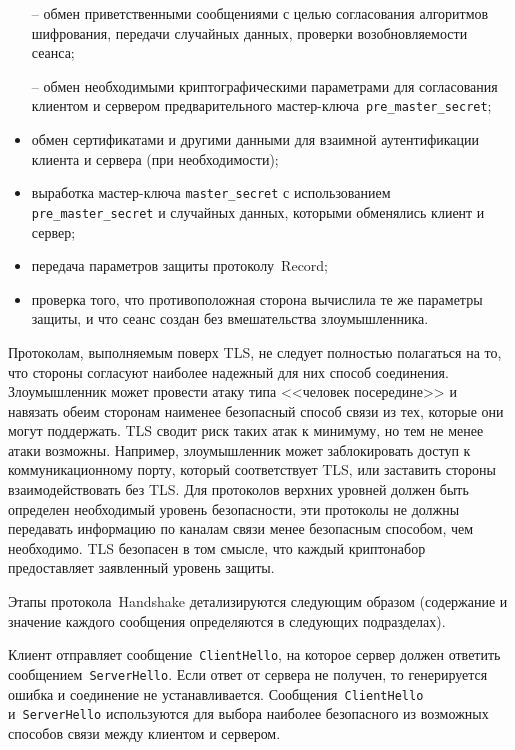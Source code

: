 \begin{itemize}
\item[--] 
обмен приветственными сообщениями с целью согласования алгоритмов 
шифрования, передачи случайных данных, проверки возобновляемости сеанса; 

\item[--] 
обмен необходимыми криптографическими параметрами для 
согласования клиентом и сервером предварительного 
мастер-ключа~\lstinline{pre_master_secret};  

\item[--]
обмен сертификатами и другими данными для взаимной аутентификации клиента 
и сервера (при необходимости); 

\item[--]
выработка мастер-ключа \lstinline{master_secret} с использованием 
\lstinline{pre_master_secret} и случайных данных, которыми обменялись  
клиент и сервер; 

\item[--]
передача параметров защиты протоколу~Record;

\item[--]
проверка того, что противоположная сторона вычислила те же параметры 
защиты, и что сеанс создан без вмешательства злоумышленника. 
\end{itemize}

Протоколам, выполняемым поверх TLS, не следует полностью полагаться на то, 
что стороны согласуют наиболее надежный для них способ соединения. 
Злоумышленник может провести атаку типа <<человек посередине>> и навязать 
обеим сторонам наименее безопасный способ связи из тех, которые они могут 
поддержать. TLS сводит риск таких атак к минимуму, но тем не менее атаки 
возможны. Например, злоумышленник может заблокировать доступ к 
коммуникационному порту, который соответствует TLS, или заставить стороны 
взаимодействовать без TLS. Для протоколов верхних уровней должен быть 
определен необходимый уровень безопасности, эти протоколы не должны 
передавать информацию по каналам связи менее безопасным способом, чем 
необходимо. TLS безопасен в том смысле, что каждый криптонабор 
предоставляет заявленный уровень защиты. 

Этапы протокола~Handshake детализируются следующим образом 
(содержание и значение каждого сообщения определяются в следующих 
подразделах). 

Клиент отправляет сообщение~\lstinline{ClientHello}, на которое сервер 
должен ответить сообщением~\lstinline{ServerHello}. Если ответ от сервера 
не получен, то генерируется ошибка и соединение не устанавливается. 
Сообщения~\lstinline{ClientHello} и~\lstinline{ServerHello} используются 
для выбора наиболее безопасного из возможных способов связи между клиентом 
и сервером.

